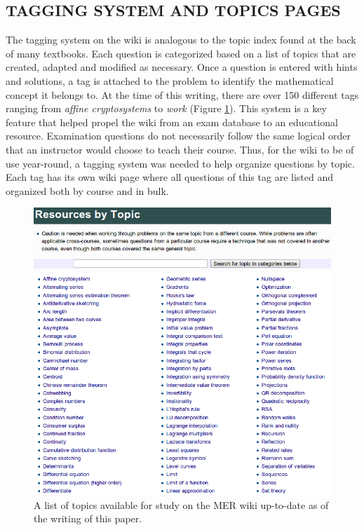 \documentclass{primus}
\begin{document}
\subsection{TAGGING SYSTEM AND TOPICS PAGES}\label{sec:Tagging_System}
The tagging system on the wiki is analogous to the topic index found at the back of many textbooks. Each question is categorized based on a list of topics that are created, adapted and modified as necessary. Once a question is entered with hints and solutions, a tag is attached to the problem to identify the mathematical concept it belongs to. At the time of this writing, there are over 150 different tags ranging from \textit{affine cryptosystems} to \textit{work} (Figure \ref{fig:wiki_tags}). This system is a key feature that helped propel the wiki from an exam database to an educational resource. Examination questions do not necessarily follow the same logical order that an instructor would choose to teach their course. Thus, for the wiki to be of use year-round, a tagging system was needed to help organize questions by topic. Each tag has its own wiki page where all questions of this tag are listed and organized both by course and in bulk.

\begin{figure}[H]
\centering
\includegraphics[width=\textwidth]{figs/Tag_List.png}
\caption{A list of topics available for study on the MER wiki up-to-date as of the writing of this paper.}\label{fig:wiki_tags}
\end{figure}
\end{document}
